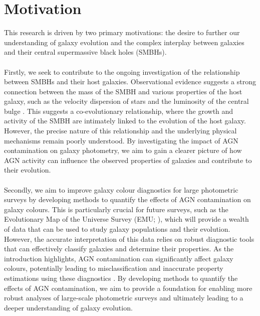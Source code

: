 \section{Motivation}
This research is driven by two primary motivations: the desire to further our understanding of galaxy evolution and the complex interplay between galaxies and their central supermassive black holes (SMBHs). \\\\
Firstly, we seek to contribute to the ongoing investigation of the relationship between SMBHs and their host galaxies.  Observational evidence suggests a strong connection between the mass of the SMBH and various properties of the host galaxy, such as the velocity dispersion of stars and the luminosity of the central bulge \citep{kormendy_coevolution_2013}.  This suggests a co-evolutionary relationship, where the growth and activity of the SMBH are intimately linked to the evolution of the host galaxy. However, the precise nature of this relationship and the underlying physical mechanisms remain poorly understood.  By investigating the impact of AGN contamination on galaxy photometry, we aim to gain a clearer picture of how AGN activity can influence the observed properties of galaxies and contribute to their evolution.\\\\ Secondly, we aim to improve galaxy colour diagnostics for large photometric surveys by developing methods to quantify the effects of AGN contamination on galaxy colours. This is particularly crucial for future surveys, such as the Evolutionary Map of the Universe Survey (EMU; \citealt{norris_evolutionary_2021}), which will provide a wealth of data that can be used to study galaxy populations and their evolution. However, the accurate interpretation of this data relies on robust diagnostic tools that can effectively classify galaxies and determine their properties. As the introduction highlights, AGN contamination can significantly affect galaxy colours, potentially leading to misclassification and inaccurate property estimations using these diagnostics \citep{cowley_decoupled_2018}. By developing methods to quantify the effects of AGN contamination, we aim to provide a foundation for enabling more robust analyses of large-scale photometric surveys and ultimately leading to a deeper understanding of galaxy evolution.
